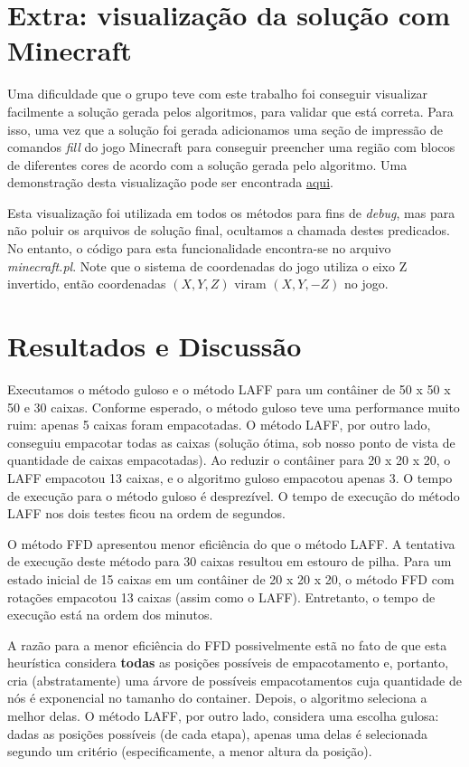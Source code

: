 \documentclass[12pt]{article}
\begin{document}
\section{Extra: visualização da solução com Minecraft}

Uma dificuldade que o grupo teve com este trabalho foi conseguir visualizar facilmente a solução gerada pelos algoritmos, para validar que está correta. Para isso, uma vez que a solução foi gerada adicionamos uma seção de impressão de comandos \textit{fill} do jogo Minecraft para conseguir preencher uma região com blocos de diferentes cores de acordo com a solução gerada pelo algoritmo. Uma demonstração desta visualização pode ser encontrada \href{https://www.youtube.com/watch?v=qInZZb9y1dQ}{aqui}.

Esta visualização foi utilizada em todos os métodos para fins de \textit{debug}, mas para não poluir os arquivos de solução final, ocultamos a chamada destes predicados. No entanto, o código para esta funcionalidade encontra-se no arquivo \textit{minecraft.pl}. Note que o sistema de coordenadas do jogo utiliza o eixo Z invertido, então coordenadas $(X, Y, Z)$ viram $(X, Y, -Z)$ no jogo.

\section{Resultados e Discussão}

Executamos o método guloso e o método LAFF para um contâiner de 50 x 50 x 50 e 30 caixas. Conforme esperado, o método guloso teve uma performance muito ruim: apenas 5 caixas foram empacotadas. O método LAFF, por outro lado, conseguiu empacotar todas as caixas (solução ótima, sob nosso ponto de vista de quantidade de caixas empacotadas). Ao reduzir o contâiner para 20 x 20 x 20, o LAFF empacotou 13 caixas, e o algoritmo guloso empacotou apenas 3. O tempo de execução para o método guloso é desprezível. O tempo de execução do método LAFF nos dois testes ficou na ordem de segundos.

O método FFD apresentou menor eficiência do que o método LAFF. A tentativa de execução deste método para 30 caixas resultou em estouro de pilha. Para um estado inicial de 15 caixas em um contâiner de 20 x 20 x 20, o método FFD com rotações empacotou 13 caixas (assim como o LAFF). Entretanto, o tempo de execução está na ordem dos minutos.

A razão para a menor eficiência do FFD possivelmente estã no fato de que esta heurística considera \textbf{todas} as posições possíveis de empacotamento e, portanto, cria (abstratamente) uma árvore de possíveis empacotamentos cuja quantidade de nós é exponencial no tamanho do container. Depois, o algoritmo seleciona a melhor delas. O método LAFF, por outro lado, considera uma escolha gulosa: dadas as posições possíveis (de cada etapa), apenas uma delas é selecionada segundo um critério (especificamente, a menor altura da posição).
\end{document}
